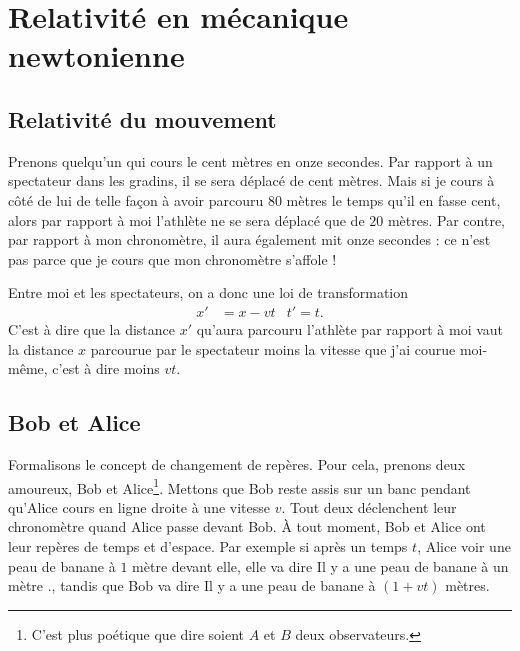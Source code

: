 
\section{Relativité en mécanique newtonienne}

\subsection{Relativité du mouvement}

Prenons quelqu'un qui cours le cent mètres en onze secondes. Par rapport à un spectateur dans les gradins, il se sera déplacé de cent mètres. Mais si je cours à côté de lui de telle façon à avoir parcouru $80$ mètres le temps qu'il en fasse cent, alors par rapport à moi l'athlète ne se sera déplacé que de $20$ mètres. Par contre, par rapport à mon chronomètre, il aura également mit onze secondes : ce n'est pas parce que je cours que mon chronomètre s'affole !

Entre moi et les spectateurs, on a donc une loi de transformation
\begin{align}		\label{EqTransGal}
x'&=x-vt&	t'=t.
\end{align}
C'est à dire que la distance $x'$ qu'aura parcouru l'athlète par rapport à moi vaut la distance $x$ parcourue par le spectateur moins la vitesse que j'ai courue moi-même, c'est à dire moins $vt$.

\subsection{Bob et Alice}

Formalisons le concept de changement de repères. Pour cela, prenons deux amoureux, Bob et Alice\footnote{C'est plus poétique que dire \og soient $A$ et $B$ deux observateurs\fg{}.}. Mettons que Bob reste assis sur un banc pendant qu'Alice cours en ligne droite à une vitesse $v$. Tout deux déclenchent leur chronomètre quand Alice passe devant Bob. À tout moment, Bob et Alice ont leur repères de temps et d'espace. Par exemple si après un temps $t$, Alice voir une peau de banane à $1$ mètre devant elle, elle va dire \og Il y a une peau de banane à un mètre .\fg{}, tandis que Bob va dire \og Il y a une peau de banane à $(1+vt)$ mètres\fg.

